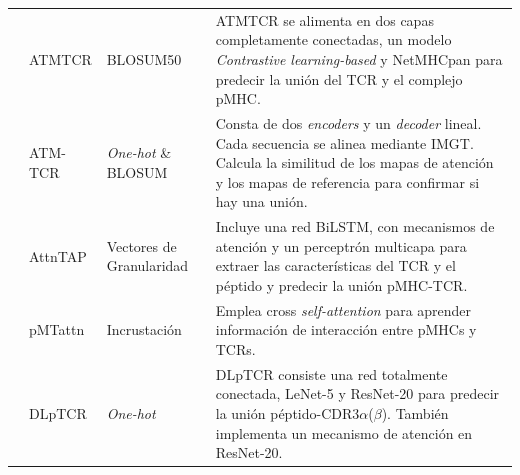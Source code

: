 \begin{table}[ht]
{\begin{scriptsize}
\begin{tabular}{p{2.5cm}p{2.5cm}p{2cm}p{6.2cm}}
			\cite{fang2022attention}	&	ATMTCR	&	BLOSUM50	&	ATMTCR se alimenta en dos capas completamente conectadas, un modelo \textit{Contrastive learning-based} y NetMHCpan para predecir la unión del TCR y el complejo pMHC.
			\\
			
			\cite{cai2022atm}	&	ATM-TCR	&	\textit{One-hot}	\& BLOSUM &	Consta de dos \textit{encoders} y un \textit{decoder} lineal. %
			Cada secuencia se alinea mediante IMGT. Calcula la similitud de los mapas de atención y los mapas de referencia para confirmar si hay una unión.\\
			
			\cite{xu2022attntap}	&	AttnTAP	& Vectores de Granularidad	&	Incluye una red BiLSTM, con mecanismos de atención y un perceptrón multicapa para extraer las características del TCR y el péptido y predecir la unión pMHC-TCR.\\
			
			
			\cite{9994875}	&	pMTattn	&	Incrustación	&	Emplea cross \textit{self-attention} para aprender información de interacción entre pMHCs y TCRs. 
			\\
			
			\cite{xu2021dlptcr}	&	DLpTCR	&	\textit{One-hot}	&    DLpTCR consiste una red totalmente conectada, LeNet-5 y ResNet-20 para predecir la unión péptido-CDR3$\alpha$($\beta$). También implementa un mecanismo de atención en ResNet-20.%
			\\
			
		
			
			
			
			
			
			
		\end{tabular}
		\end{scriptsize}
}
\end{table}

